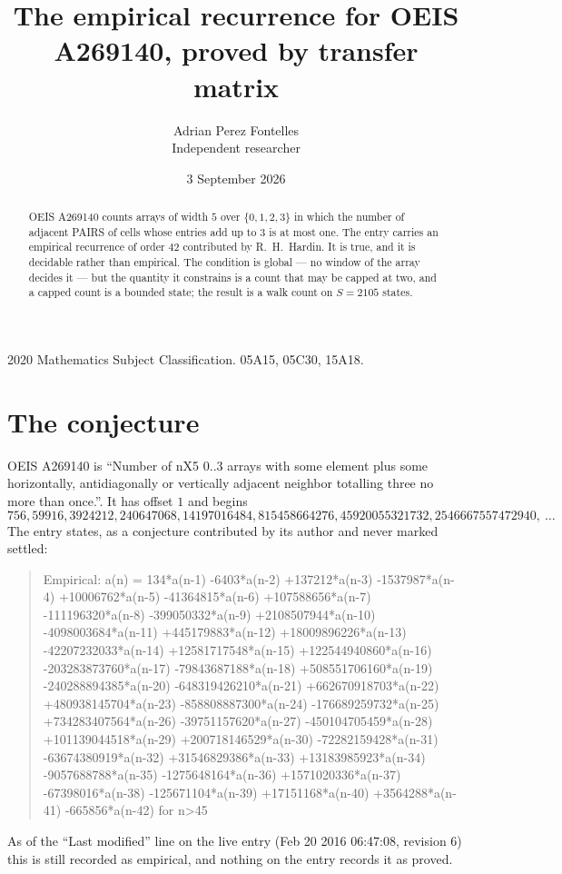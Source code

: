 \documentclass[11pt,a4paper]{article}
\title{The empirical recurrence for OEIS A269140, proved by transfer matrix}
\author{Adrian Perez Fontelles\\ \small Independent researcher}
\date{3 September 2026}
\theoremstyle{plain}
\theoremstyle{definition}
\begin{document}
\maketitle

\begin{abstract}
OEIS A269140 counts arrays of width $5$ over $\{0,1,2,3\}$ in which the number of adjacent PAIRS of
cells whose entries add up to $3$ is at most one. The entry carries an empirical recurrence of
order $42$ contributed by R.~H.~Hardin. It is true, and it is decidable rather than
empirical. The condition is global --- no window of the array decides it --- but the quantity
it constrains is a count that may be capped at two, and a capped count is a bounded state; the
result is a walk count on $S=2105$ states.
\end{abstract}

\noindent\small 2020 Mathematics Subject Classification. 05A15, 05C30, 15A18.\normalsize

\section{The conjecture}

OEIS A269140 is ``Number of nX5 0..3 arrays with some element plus some horizontally, antidiagonally or vertically adjacent neighbor totalling three no more than once.''. It has offset $1$ and begins
\[
756, 59916, 3924212, 240647068, 14197016484, 815458664276, 45920055321732, 2546667557472940,\ \dots
\]
The entry states, as a conjecture contributed by its author and never marked settled:
\begin{quote}
Empirical: a(n) = 134*a(n-1) -6403*a(n-2) +137212*a(n-3) -1537987*a(n-4) +10006762*a(n-5) -41364815*a(n-6) +107588656*a(n-7) -111196320*a(n-8) -399050332*a(n-9) +2108507944*a(n-10) -4098003684*a(n-11) +445179883*a(n-12) +18009896226*a(n-13) -42207232033*a(n-14) +12581717548*a(n-15) +122544940860*a(n-16) -203283873760*a(n-17) -79843687188*a(n-18) +508551706160*a(n-19) -240288894385*a(n-20) -648319426210*a(n-21) +662670918703*a(n-22) +480938145704*a(n-23) -858808887300*a(n-24) -176689259732*a(n-25) +734283407564*a(n-26) -39751157620*a(n-27) -450104705459*a(n-28) +101139044518*a(n-29) +200718146529*a(n-30) -72282159428*a(n-31) -63674380919*a(n-32) +31546829386*a(n-33) +13183985923*a(n-34) -9057688788*a(n-35) -1275648164*a(n-36) +1571020336*a(n-37) -67398016*a(n-38) -125671104*a(n-39) +17151168*a(n-40) +3564288*a(n-41) -665856*a(n-42) for n>45
\end{quote}
As of the ``Last modified'' line on the live entry (Feb 20 2016 06:47:08, revision 6) this is still
recorded as empirical, and nothing on the entry records it as proved.
\end{document}
